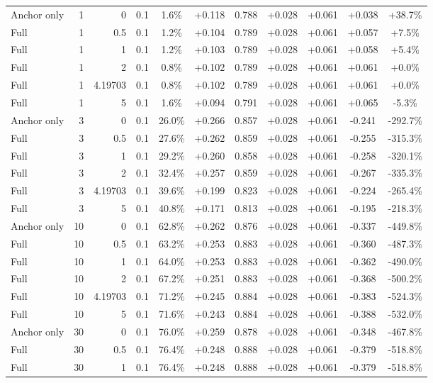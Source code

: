 \begin{table}[htbp]
\begin{tabular}{lrrrccccccc}
Anchor only & 1 & 0 & 0.1 & 1.6\% & +0.118 & 0.788 & +0.028 & +0.061 & +0.038 & +38.7\% \\
Full & 1 & 0.5 & 0.1 & 1.2\% & +0.104 & 0.789 & +0.028 & +0.061 & +0.057 & +7.5\% \\
Full & 1 & 1 & 0.1 & 1.2\% & +0.103 & 0.789 & +0.028 & +0.061 & +0.058 & +5.4\% \\
Full & 1 & 2 & 0.1 & 0.8\% & +0.102 & 0.789 & +0.028 & +0.061 & +0.061 & +0.0\% \\
Full & 1 & 4.19703 & 0.1 & 0.8\% & +0.102 & 0.789 & +0.028 & +0.061 & +0.061 & +0.0\% \\
Full & 1 & 5 & 0.1 & 1.6\% & +0.094 & 0.791 & +0.028 & +0.061 & +0.065 & -5.3\% \\
Anchor only & 3 & 0 & 0.1 & 26.0\% & +0.266 & 0.857 & +0.028 & +0.061 & -0.241 & -292.7\% \\
Full & 3 & 0.5 & 0.1 & 27.6\% & +0.262 & 0.859 & +0.028 & +0.061 & -0.255 & -315.3\% \\
Full & 3 & 1 & 0.1 & 29.2\% & +0.260 & 0.858 & +0.028 & +0.061 & -0.258 & -320.1\% \\
Full & 3 & 2 & 0.1 & 32.4\% & +0.257 & 0.859 & +0.028 & +0.061 & -0.267 & -335.3\% \\
Full & 3 & 4.19703 & 0.1 & 39.6\% & +0.199 & 0.823 & +0.028 & +0.061 & -0.224 & -265.4\% \\
Full & 3 & 5 & 0.1 & 40.8\% & +0.171 & 0.813 & +0.028 & +0.061 & -0.195 & -218.3\% \\
Anchor only & 10 & 0 & 0.1 & 62.8\% & +0.262 & 0.876 & +0.028 & +0.061 & -0.337 & -449.8\% \\
Full & 10 & 0.5 & 0.1 & 63.2\% & +0.253 & 0.883 & +0.028 & +0.061 & -0.360 & -487.3\% \\
Full & 10 & 1 & 0.1 & 64.0\% & +0.253 & 0.883 & +0.028 & +0.061 & -0.362 & -490.0\% \\
Full & 10 & 2 & 0.1 & 67.2\% & +0.251 & 0.883 & +0.028 & +0.061 & -0.368 & -500.2\% \\
Full & 10 & 4.19703 & 0.1 & 71.2\% & +0.245 & 0.884 & +0.028 & +0.061 & -0.383 & -524.3\% \\
Full & 10 & 5 & 0.1 & 71.6\% & +0.243 & 0.884 & +0.028 & +0.061 & -0.388 & -532.0\% \\
Anchor only & 30 & 0 & 0.1 & 76.0\% & +0.259 & 0.878 & +0.028 & +0.061 & -0.348 & -467.8\% \\
Full & 30 & 0.5 & 0.1 & 76.4\% & +0.248 & 0.888 & +0.028 & +0.061 & -0.379 & -518.8\% \\
Full & 30 & 1 & 0.1 & 76.4\% & +0.248 & 0.888 & +0.028 & +0.061 & -0.379 & -518.8\% \\

\end{tabular}
\end{table}
